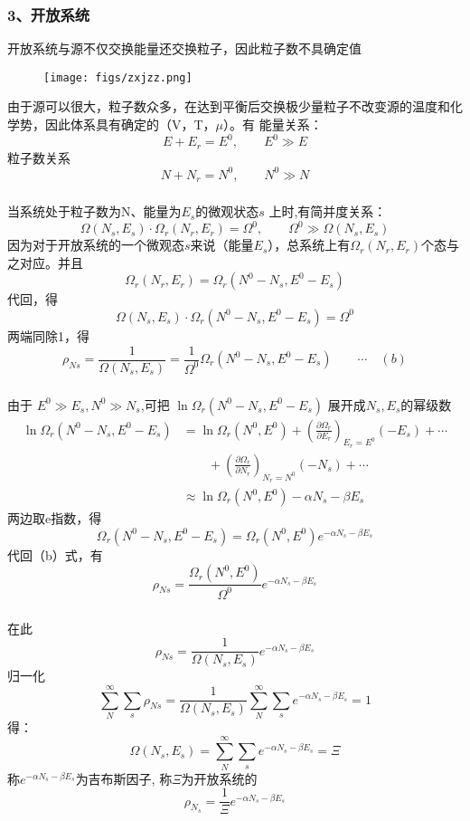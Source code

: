 \begin{frame}
  \frametitle{ 3、开放系统}
  开放系统与源不仅交换能量还交换粒子，因此粒子数不具确定值
  \begin{figure}[htbp]
    \centering
    \texttt{[image: figs/zxjzz.png]}
  \end{figure}
  由于源可以很大，粒子数众多，在达到平衡后交换极少量粒子不改变源的温度和化学势，因此体系具有确定的（V，T，$\mu$）。有
  能量关系：
  \[ E + E_r = E^0, \qquad E^0 \gg E\] 
  粒子数关系
  \[ N + N_r = N^0, \qquad N^0 \gg N\]  
\end{frame} 

\begin{frame}
  \frametitle{}
  当系统处于粒子数为N、能量为$E_s$的微观状态$s$ 上时,有简并度关系：
  \[ \Omega(N_s, E_s) \cdot \Omega _r(N_r, E_r) = \Omega ^0, \qquad \Omega ^0 \gg \Omega(N_s, E_s)\]
  因为对于开放系统的一个微观态$s$来说（能量$E_s$），总系统上有$\Omega _r (N_r,E_r)$个态与之对应。并且
  \[\Omega _r (N_r, E_r) = \Omega _r(N^0 - N_s , E^0 - E_s) \] 
  代回，得 
  \[ \Omega(N_s, E_s) \cdot \Omega _r(N^0 - N_s , E^0 - E_s) = \Omega ^0\]
  两端同除1，得
  \[ \rho _{Ns} = \frac{1}{\Omega(N_s, E_s)} = \frac{1}{\Omega ^0}\Omega _r(N^0 - N_s , E^0 - E_s) \qquad \cdots  \quad (b)\]
\end{frame} 

\begin{frame}
  \frametitle{}
由于 $ E^0 \gg E_s, N^0 \gg N_s $,可把  $ \ln \Omega _r(N^0 - N_s , E^0 - E_s)  $ 展开成$N_s, E_s$的幂级数
\[ 
\begin{aligned}
  \ln \Omega _r(N^0 - N_s , E^0 - E_s)  &=  \ln \Omega _r (N^0 , E^0) + \left(\frac{\partial \Omega _r }{\partial E_r}\right)_{E_r =E^0} (-E_s) +\cdots \\ 
  & \qquad + \left(\frac{\partial \Omega _r }{\partial N_r}\right)_{N_r =N^0} (-N_s) +\cdots \\ 
  & \approx \ln \Omega _r (N^0 , E^0) - \alpha  N_s - \beta  E_s 
\end{aligned}  
\] 
两边取e指数，得
\[ \Omega _r(N^0 - N_s , E^0 - E_s) = \Omega _r (N^0 , E^0) e^{- \alpha  N_s - \beta E_s }\]
代回（b）式，有
\[\rho _{Ns}  =  \frac{\Omega _r (N^0 , E^0)}{\Omega^0 } e^{- \alpha  N_s - \beta E_s }\]
\end{frame} 

\begin{frame}
  \frametitle{}
在此
\[\rho  _{Ns}  =  \frac{1}{\Omega(N_s, E_s) } e^{- \alpha  N_s - \beta E_s }\] 
归一化
\[\sum_N^{\infty}\sum_s  \rho  _{Ns} = \frac{1}{\Omega(N_s, E_s) }  \sum_N^{\infty} \sum_s   e^{- \alpha  N_s - \beta E_s } =1 \]
得：
\[\Omega(N_s, E_s) = \sum_N^{\infty} \sum_s  e^{- \alpha  N_s - \beta E_s } = \Xi \]
称$ e^{- \alpha  N_s - \beta E_s }$为吉布斯因子, 称$\Xi $为开放系统的\emf[巨配分函数]  \\
\emf[微观态参与概率：] 
\begin{equation}
  \boxed{\rho  _{N_s}  =  \frac{1}{\Xi} e^{- \alpha  N_s - \beta E_s }} 
\end{equation}
\end{frame} 

